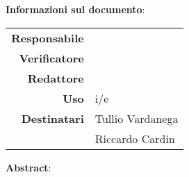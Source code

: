 \begin{center}
\textbf{Informazioni sul documento}: \\
\vspace{0.5cm}

\begin{tabular}{r|l}
    \textbf{Responsabile} &  \\ 
    \textbf{Verificatore} &  \\ 
    \textbf{Redattore} &     \\ 
    \textbf{Uso} & i/e \\ 
    \textbf{Destinatari} & Tullio Vardanega \\ & Riccardo Cardin \\ 
\end{tabular}

\vfill

\textbf{Abstract}: \\
\vspace{0.5cm}

\end{center}


\bigskip
